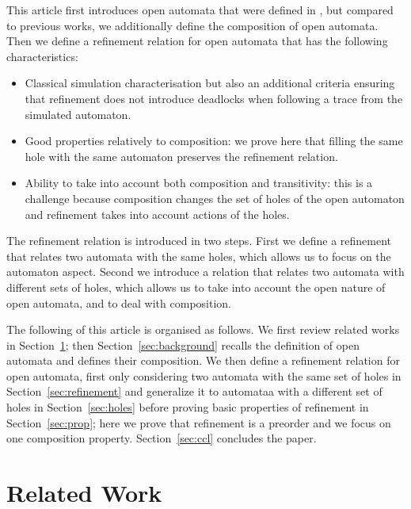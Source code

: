 \documentclass[runningheads]{llncs}
\begin{document}
This article first introduces open automata that were defined in  \cite{henrio:01299562},  but compared to previous works, we additionally define the composition of open automata.
Then we define  a refinement relation for open automata that has the following characteristics:
\begin{itemize}
\item Classical simulation characterisation but also an additional criteria ensuring that refinement does not introduce deadlocks when following a trace from the simulated automaton.
\item Good properties relatively to composition: we prove here that filling the same hole  with the same automaton preserves the refinement relation.
\item Ability to take into account both composition and transitivity: this is a challenge because composition changes the set of holes of the open automaton and refinement takes into account actions of the holes.
\end{itemize}
The refinement relation is introduced in two steps. First we define a refinement that relates two automata with the same holes, which allows us to focus on the automaton aspect. Second we introduce a relation that relates two automata with different sets of holes, which allows us to take into account the open nature of open automata, and to deal with composition.


The following of this article is organised as follows. 
We first review related works in Section~\ref{sec:sota}; then Section~\ref{sec:background} recalls the definition of open automata and defines their composition. 
We  then  define a refinement relation for open automata, first only considering two automata with the same set of holes in Section~\ref{sec:refinement} and generalize it to automataa with a different set of holes in Section~\ref{sec:holes} before proving basic properties of refinement in Section~\ref{sec:prop}; here we prove that refinement is a preorder and we focus on one composition property. 
Section~\ref{sec:ccl} concludes the paper.

\section{Related Work}
\label{sec:sota}

\end{document}
